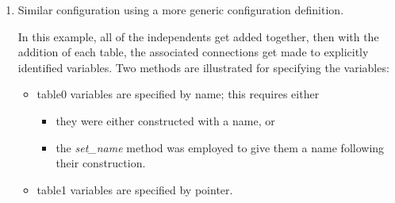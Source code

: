 \documentclass[11pt,fleqn]{report}
\begin{document}
\begin{enumerate}
The notable limitations on this simple method are:
\begin{itemize}
 \item the variables must appear in a convenient order.  If
 \textit{table1} instead represented function $h(var0, var2)$,
 this method will not work.
\item   It is also difficult to maintain because it relies on a certain
 ordering and is not as well structured as it might be.
\end{itemize}

\item Similar configuration using a more generic configuration definition.

In this example, all of the independents get added together, then with
the addition of each table, the associated connections get made to
explicitly identified variables.
Two methods are illustrated for specifying the variables:
\begin{itemize}
 \item table0 variables are specified by name; this requires either
 \begin{itemize}
  \item they were either constructed with a name, or
  \item the \textit{set\_name} method was employed to give them a name following
  their construction.
 \end{itemize}
 \item table1 variables are specified by pointer.
\end{itemize}


\end{enumerate}
\end{document}
